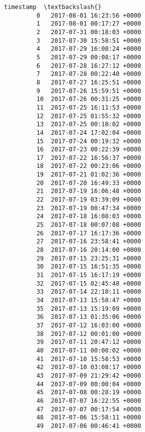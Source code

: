 \documentclass[11pt]{article}
\begin{document}
\begin{Verbatim}[commandchars=\\\{\}]
                             timestamp  \textbackslash{}
         0   2017-08-01 16:23:56 +0000   
         1   2017-08-01 00:17:27 +0000   
         2   2017-07-31 00:18:03 +0000   
         3   2017-07-30 15:58:51 +0000   
         4   2017-07-29 16:00:24 +0000   
         5   2017-07-29 00:08:17 +0000   
         6   2017-07-28 16:27:12 +0000   
         7   2017-07-28 00:22:40 +0000   
         8   2017-07-27 16:25:51 +0000   
         9   2017-07-26 15:59:51 +0000   
         10  2017-07-26 00:31:25 +0000   
         11  2017-07-25 16:11:53 +0000   
         12  2017-07-25 01:55:32 +0000   
         13  2017-07-25 00:10:02 +0000   
         14  2017-07-24 17:02:04 +0000   
         15  2017-07-24 00:19:32 +0000   
         16  2017-07-23 00:22:39 +0000   
         17  2017-07-22 16:56:37 +0000   
         18  2017-07-22 00:23:06 +0000   
         19  2017-07-21 01:02:36 +0000   
         20  2017-07-20 16:49:33 +0000   
         21  2017-07-19 16:06:48 +0000   
         22  2017-07-19 03:39:09 +0000   
         23  2017-07-19 00:47:34 +0000   
         24  2017-07-18 16:08:03 +0000   
         25  2017-07-18 00:07:08 +0000   
         26  2017-07-17 16:17:36 +0000   
         27  2017-07-16 23:58:41 +0000   
         28  2017-07-16 20:14:00 +0000   
         29  2017-07-15 23:25:31 +0000   
         30  2017-07-15 16:51:35 +0000   
         31  2017-07-15 16:17:19 +0000   
         32  2017-07-15 02:45:48 +0000   
         33  2017-07-14 22:10:11 +0000   
         34  2017-07-13 15:58:47 +0000   
         35  2017-07-13 15:19:09 +0000   
         36  2017-07-13 01:35:06 +0000   
         37  2017-07-12 16:03:00 +0000   
         38  2017-07-12 00:01:00 +0000   
         39  2017-07-11 20:47:12 +0000   
         40  2017-07-11 00:00:02 +0000   
         41  2017-07-10 15:58:53 +0000   
         42  2017-07-10 03:08:17 +0000   
         43  2017-07-09 21:29:42 +0000   
         44  2017-07-09 00:00:04 +0000   
         45  2017-07-08 00:28:19 +0000   
         46  2017-07-07 16:22:55 +0000   
         47  2017-07-07 00:17:54 +0000   
         48  2017-07-06 15:58:11 +0000   
         49  2017-07-06 00:46:41 +0000   
         

\end{Verbatim}
\end{document}

